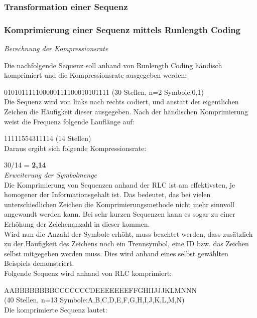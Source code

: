 \documentclass[12pt,german]{article}
\begin{document}
\subsubsection{Transformation einer Sequenz}

\subsubsection{Komprimierung einer Sequenz mittels Runlength Coding}
\textit{Berechnung der Kompressionsrate} 

Die nachfolgende Sequenz soll anhand von Runlength Coding händisch komprimiert und die Kompressionsrate ausgegeben werden:

010101111100000111100010101111 (30 Stellen, n=2 Symbole:0,1) \\

Die Sequenz wird von links nach rechts codiert, und anstatt der eigentlichen Zeichen die Häufigkeit dieser ausgegeben. Nach der händischen Komprimierung weist die Frequenz folgende Lauflänge auf:

11111554311114 (14 Stellen)\\


Daraus ergibt sich folgende Kompressionsrate:

30/14 = \textbf{ 2,14}\\

\textit{Erweiterung der Symbolmenge}\\
Die Komprimierung von Sequenzen anhand der RLC ist am effektivsten, je homogener der Informationsgehalt ist. Das bedeutet, das bei vielen unterschiedlichen Zeichen die Komprimierungsmethode nicht mehr sinnvoll angewandt werden kann. Bei sehr kurzen Sequenzen kann es sogar zu einer Erhöhung der Zeichenanzahl in dieser kommen.\\

Wird nun die Anzahl der Symbole erhöht, muss beachtet werden, dass zusätzlich zu der Häufigkeit des Zeichens noch ein Trennsymbol, eine ID bzw. das Zeichen selbst mitgegeben werden muss. Dies wird anhand eines selbst gewählten Beispiels demonstriert.\\

Folgende Sequenz wird anhand von RLC komprimiert:

AABBBBBBBBCCCCCCCDEEEEEEEFFGHIIJJJKLMNNN\\ (40 Stellen, n=13 Symbole:A,B,C,D,E,F,G,H,I,J,K,L,M,N)\\

Die komprimierte Sequenz lautet:
\end{document}
